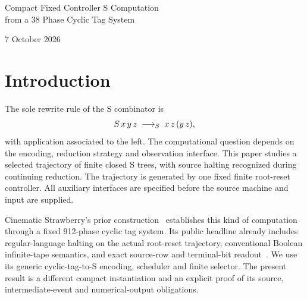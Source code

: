 

\begin{center}
{\LARGE Compact Fixed Controller S Computation\\[4pt]
from a 38 Phase Cyclic Tag System\par}
\vspace{12pt}
7 October 2026
\end{center}
\vspace{6pt}
\begin{abstract}
A fixed finite controller can select native S-combinator contractions that
simulate a compact universal cyclic tag system. We give a concrete
38-phase instance, an explicit compiler from finite natural-register machines,
and a direct compiler from conventional integer-tape Turing machines with
arbitrary finite alphabets. A fixed regular tree language recognizes source
halting. At its first accepted sample, a fixed current-tree decoder returns
the exact register-machine result. The controller restarts at the root on
each invocation, retains no state between invocations, and has an all-input
linear invocation bound. The generic cyclic-tag-to-S construction is due to
Cinematic Strawberry, whose earlier 912-phase construction already establishes
fixed-controller universality for Boolean tapes. The contributions here are
the compact source route, its explicit formal compiler, and the generated-origin
and first-event numerical composition for this instance. All 67 project modules
passed fresh Lean 4.33.1 kernel replay. Complete operation-cost interpretations
are stated separately from the checked semantic and size lemmas.
\end{abstract}

\section{Introduction}

The sole rewrite rule of the S combinator is
\[
       S\,x\,y\,z \;\mathrel{\longrightarrow_{S}}\; x\,z\,(y\,z),
\]
with application associated to the left. The computational question depends
on the encoding, reduction strategy and observation interface. This paper
studies a selected trajectory of finite closed S trees, with source halting
recognized during continuing reduction. The trajectory is generated by one
fixed finite root-reset controller. All auxiliary interfaces are specified
before the source machine and input are supplied.

Cinematic Strawberry's prior construction~\cite{strawberry} establishes this
kind of computation through a fixed 912-phase cyclic tag system. Its public
headline already includes regular-language halting on the actual root-reset
trajectory, conventional Boolean infinite-tape semantics, and exact source-row
and terminal-bit readout~\cite{headline,infinite,prioroutput}. We use its generic
cyclic-tag-to-S encoding, scheduler and finite selector. The present result is
a different compact instantiation and an explicit proof of its source,
intermediate-event and numerical-output obligations.

